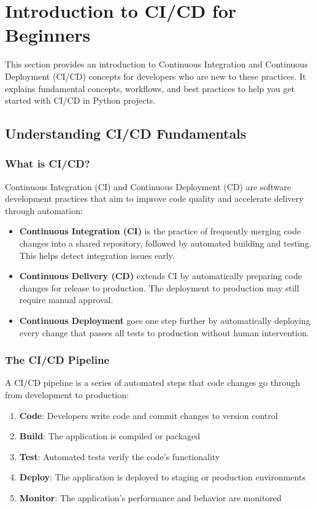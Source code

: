 \section{Introduction to CI/CD for Beginners}

This section provides an introduction to Continuous Integration and Continuous Deployment (CI/CD) concepts for developers who are new to these practices. It explains fundamental concepts, workflows, and best practices to help you get started with CI/CD in Python projects.

\subsection{Understanding CI/CD Fundamentals}

\subsubsection{What is CI/CD?}
Continuous Integration (CI) and Continuous Deployment (CD) are software development practices that aim to improve code quality and accelerate delivery through automation:

\begin{itemize}
    \item \textbf{Continuous Integration (CI)} is the practice of frequently merging code changes into a shared repository, followed by automated building and testing. This helps detect integration issues early.
    
    \item \textbf{Continuous Delivery (CD)} extends CI by automatically preparing code changes for release to production. The deployment to production may still require manual approval.
    
    \item \textbf{Continuous Deployment} goes one step further by automatically deploying every change that passes all tests to production without human intervention.
\end{itemize}

\subsubsection{The CI/CD Pipeline}
A CI/CD pipeline is a series of automated steps that code changes go through from development to production:

\begin{enumerate}
    \item \textbf{Code}: Developers write code and commit changes to version control
    \item \textbf{Build}: The application is compiled or packaged
    \item \textbf{Test}: Automated tests verify the code's functionality
    \item \textbf{Deploy}: The application is deployed to staging or production environments
    \item \textbf{Monitor}: The application's performance and behavior are monitored
\end{enumerate}

